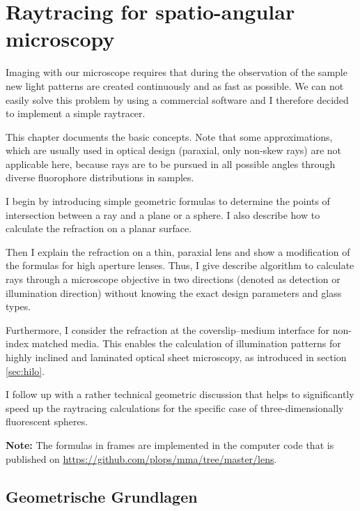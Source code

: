 \chapter{Raytracing for spatio-angular microscopy}
\label{sec:raytrace}
\renewcommand{\i}{\nvect i}
\begin{summary}
  Imaging with our microscope requires that during the observation of
  the sample new light patterns are created continuously and as fast
  as possible. We can not easily solve this problem by using a
  commercial software and I therefore decided to implement a simple
  raytracer.

  This chapter documents the basic concepts. Note that some
  approximations, which are usually used in optical design (paraxial,
  only non-skew rays) are not applicable here, because rays are to be
  pursued in all possible angles through diverse fluorophore
  distributions in samples.

  I begin by introducing simple geometric formulas to determine the
  points of intersection between a ray and a plane or a sphere. I also
  describe how to calculate the refraction on a planar surface.

  Then I explain the refraction on a thin, paraxial lens and show a
  modification of the formulas for high aperture lenses. Thus, I give
  describe algorithm to calculate rays through a microscope objective
  in two directions (denoted as detection or illumination direction)
  without knowing the exact design parameters and glass types.

  Furthermore, I consider the refraction at the coverslip--medium
  interface for non-index matched media. This enables the calculation
  of illumination patterns for highly inclined and laminated optical
  sheet microscopy, as introduced in section \ref{sec:hilo}.

  I follow up with a rather technical geometric discussion that helps
  to significantly speed up the raytracing calculations for the
  specific case of three-dimensionally fluorescent spheres.

  {\bf Note:} The formulas in frames are implemented in the computer
  code that is published on
  \url{https://github.com/plops/mma/tree/master/lens}.
\end{summary}
\section{Geometrische Grundlagen}
